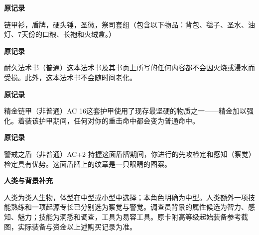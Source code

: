 \documentclass[letterpaper,openany,twoside,twocolumn]{book}
\begin{document}
\par\noindent\textbf{原记录}\par
链甲衫，盾牌，硬头锤，圣徽，祭司套组（包含以下物品：背包、毯子、圣水、油灯、7天份的口粮、长袍和火绒盒。）\par


\par\noindent\textbf{原记录}\par
耐久法术书（普通）这本法术书及其书页上所写的任何内容都不会因火烧或浸水而受损。此外，这本法术书不会随时间老化。\par


\par\noindent\textbf{原记录}\par
精金链甲（非普通）AC 16这套护甲使用了现存最坚硬的物质之一——精金加以强化。着装该护甲期间，任何对你的重击命中都会变为普通命中。\par


\par\noindent\textbf{原记录}\par
警戒之盾（非普通）AC+2 持握这面盾牌期间，你进行的先攻检定和感知（察觉）检定具有优势。这面盾牌上的纹章是一只眼睛的图案。\par


\par\noindent\textbf{人类与背景补充}\par
人类为类人生物，体型在中型或小型中选择；本角色明确为中型。人类额外一项技能熟练和一项起源专长已分别选为察觉与警觉。调查员背景的属性候选为智力、感知、魅力；技能为洞悉和调查，工具为易容工具。原卡附高等级起始装备参考截图，实际装备与资金以上述购买记录为准。\par
\end{document}
